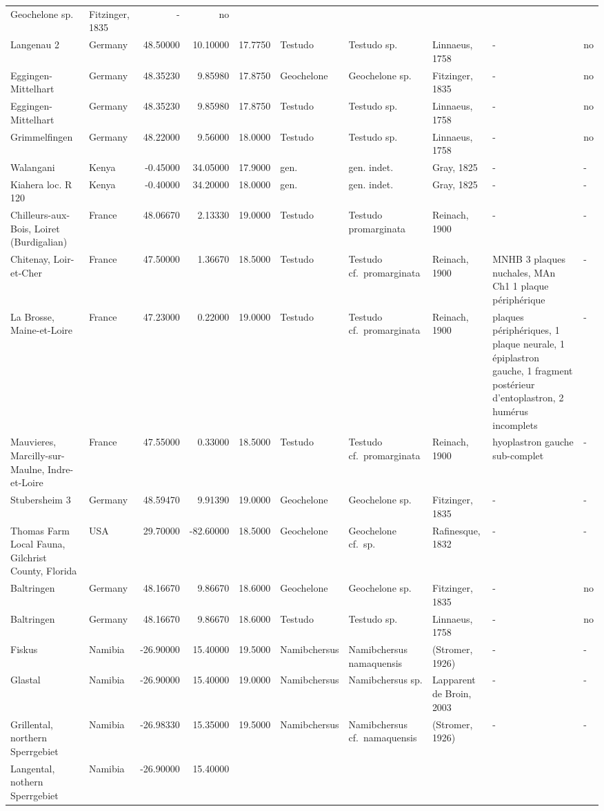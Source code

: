 \documentclass[]{article}
\begin{document}
\begin{longtable}[]{@{}llrrrlllll@{}}
Geochelone sp. & Fitzinger, 1835 & - & no\tabularnewline
Langenau 2 & Germany & 48.50000 & 10.10000 & 17.7750 & Testudo & Testudo
sp. & Linnaeus, 1758 & - & no\tabularnewline
Eggingen-Mittelhart & Germany & 48.35230 & 9.85980 & 17.8750 &
Geochelone & Geochelone sp. & Fitzinger, 1835 & - & no\tabularnewline
Eggingen-Mittelhart & Germany & 48.35230 & 9.85980 & 17.8750 & Testudo &
Testudo sp. & Linnaeus, 1758 & - & no\tabularnewline
Grimmelfingen & Germany & 48.22000 & 9.56000 & 18.0000 & Testudo &
Testudo sp. & Linnaeus, 1758 & - & no\tabularnewline
Walangani & Kenya & -0.45000 & 34.05000 & 17.9000 & gen. & gen. indet. &
Gray, 1825 & - & -\tabularnewline
Kiahera loc. R 120 & Kenya & -0.40000 & 34.20000 & 18.0000 & gen. & gen.
indet. & Gray, 1825 & - & -\tabularnewline
Chilleurs-aux-Bois, Loiret (Burdigalian) & France & 48.06670 & 2.13330 &
19.0000 & Testudo & Testudo promarginata & Reinach, 1900 & - &
-\tabularnewline
Chitenay, Loir-et-Cher & France & 47.50000 & 1.36670 & 18.5000 & Testudo
& Testudo cf.~promarginata & Reinach, 1900 & MNHB 3 plaques nuchales,
MAn Ch1 1 plaque périphérique & -\tabularnewline
La Brosse, Maine-et-Loire & France & 47.23000 & 0.22000 & 19.0000 &
Testudo & Testudo cf.~promarginata & Reinach, 1900 & plaques
périphériques, 1 plaque neurale, 1 épiplastron gauche, 1 fragment
postérieur d'entoplastron, 2 humérus incomplets & -\tabularnewline
Mauvieres, Marcilly-sur-Maulne, Indre-et-Loire & France & 47.55000 &
0.33000 & 18.5000 & Testudo & Testudo cf.~promarginata & Reinach, 1900 &
hyoplastron gauche sub-complet & -\tabularnewline
Stubersheim 3 & Germany & 48.59470 & 9.91390 & 19.0000 & Geochelone &
Geochelone sp. & Fitzinger, 1835 & - & -\tabularnewline
Thomas Farm Local Fauna, Gilchrist County, Florida & USA & 29.70000 &
-82.60000 & 18.5000 & Geochelone & Geochelone cf.~sp. & Rafinesque, 1832
& - & -\tabularnewline
Baltringen & Germany & 48.16670 & 9.86670 & 18.6000 & Geochelone &
Geochelone sp. & Fitzinger, 1835 & - & no\tabularnewline
Baltringen & Germany & 48.16670 & 9.86670 & 18.6000 & Testudo & Testudo
sp. & Linnaeus, 1758 & - & no\tabularnewline
Fiskus & Namibia & -26.90000 & 15.40000 & 19.5000 & Namibchersus &
Namibchersus namaquensis & (Stromer, 1926) & - & -\tabularnewline
Glastal & Namibia & -26.90000 & 15.40000 & 19.0000 & Namibchersus &
Namibchersus sp. & Lapparent de Broin, 2003 & - & -\tabularnewline
Grillental, northern Sperrgebiet & Namibia & -26.98330 & 15.35000 &
19.5000 & Namibchersus & Namibchersus cf.~namaquensis & (Stromer, 1926)
& - & -\tabularnewline
Langental, nothern Sperrgebiet & Namibia & -26.90000 & 15.40000 &

\end{longtable}
\end{document}
